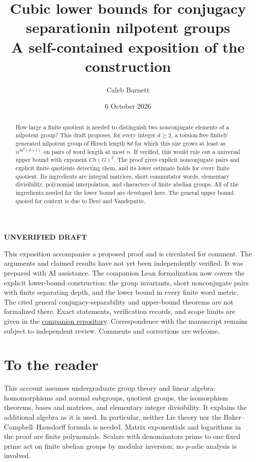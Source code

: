 \documentclass[11pt]{article}
\title{Cubic lower bounds for conjugacy separation\newline in nilpotent groups\\[.4em]\large A self-contained exposition of the construction}
\author{Caleb Barnett}
\date{6 October 2026}
\numberwithin{equation}{section}
\theoremstyle{definition}
\theoremstyle{remark}
\begin{document}
\maketitle

\begin{center}
\textbf{UNVERIFIED DRAFT}\\[6pt]
\begin{minipage}{0.92\textwidth}
\small
This exposition accompanies a proposed proof and is circulated for comment.
The arguments and claimed results have not yet been independently verified.
It was prepared with AI assistance. The companion Lean formalization
now covers the explicit lower-bound construction: the group invariants,
short nonconjugate pairs with finite separating depth, and the lower bound
in every finite word metric. The cited general conjugacy-separability
and upper-bound theorems are not formalized there. Exact statements,
verification records, and scope limits are given in the
\href{https://github.com/barnettcaleb1/nilpotent-conjugacy}{companion repository}.
Correspondence with the manuscript remains subject to independent review.
Comments and corrections are welcome.
\end{minipage}
\end{center}

\begin{abstract}
How large a finite quotient is needed to distinguish two nonconjugate elements of a nilpotent group? This draft proposes, for every integer $d\ge2$, a torsion-free finitely generated nilpotent group of Hirsch length $8d$ for which this size grows at least as $n^{3d^2(d+1)}$ on pairs of word length at most $n$. If verified, this would rule out a universal upper bound with exponent $C h(G)^2$. The proof gives explicit nonconjugate pairs and explicit finite quotients detecting them, and its lower estimate holds for every finite quotient. Its ingredients are integral matrices, short commutator words, elementary divisibility, polynomial interpolation, and characters of finite abelian groups. All of the ingredients needed for the lower bound are developed here. The general upper bound quoted for context is due to Der\'e and Vandeputte.
\end{abstract}

\section*{To the reader}
This account assumes undergraduate group theory and linear algebra: homomorphisms and normal subgroups, quotient groups, the isomorphism theorems, bases and matrices, and elementary integer divisibility. It explains the additional algebra as it is used. In particular, neither Lie theory nor the Baker--Campbell--Hausdorff formula is needed. Matrix exponentials and logarithms in the proof are finite polynomials. Scalars with denominators prime to one fixed prime act on finite abelian groups by modular inversion; no $p$-adic analysis is involved.
\end{document}
